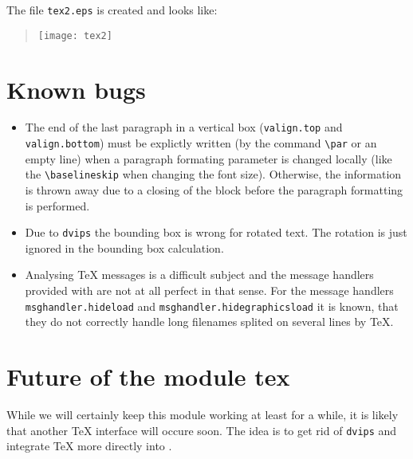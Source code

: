 The file \verb|tex2.eps| is created and looks like:
\begin{quote}
\texttt{[image: tex2]}
\end{quote}

\section{Known bugs}
\begin{itemize}
\item The end of the last paragraph in a vertical box
(\verb|valign.top| and \verb|valign.bottom|) must be explictly
written (by the command \verb|\par| or an empty line) when a paragraph
formating parameter is changed locally (like the \verb|\baselineskip|
when changing the font size).  Otherwise, the information is thrown
away due to a closing of the block before the paragraph formatting is
performed.
\item Due to \verb|dvips| the bounding box is wrong for rotated text.
The rotation is just ignored in the bounding box calculation.
\item Analysing \TeX{} messages is a difficult subject and the message
handlers provided with \PyX{} are not at all perfect in that sense.
For the message handlers \verb|msghandler.hideload| and
\verb|msghandler.hidegraphicsload| it is known, that they do not
correctly handle long filenames splited on several lines by \TeX.
\end{itemize}

\section{Future of the module tex}
While we will certainly keep this module working at least for a while,
it is likely that another \TeX{} interface will occure soon. The idea
is to get rid of \verb|dvips| and integrate \TeX{} more directly into
\PyX.

